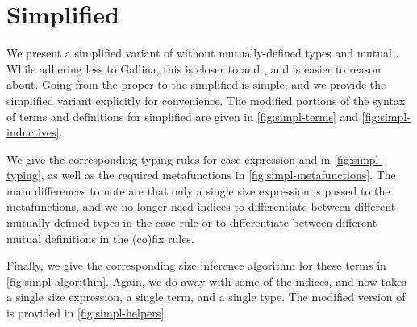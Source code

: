\section{Simplified \titlelang}
We present a simplified variant of \lang without mutually-defined \coinductive types and mutual \cofixpoints.
While adhering less to Gallina, this is closer to \CIChatminus and \CIChat, and is easier to reason about.
Going from the proper \lang to the simplified \lang is simple, and we provide the simplified variant explicitly for convenience.
The modified portions of the syntax of terms and \coinductive definitions for simplified \lang are given in \autoref{fig:simpl-terms} and \autoref{fig:simpl-inductives}.



We give the corresponding typing rules for case expression and \cofixpoints in \autoref{fig:simpl-typing}, as well as the required metafunctions in \autoref{fig:simpl-metafunctions}. The main differences to note are that only a single size expression is passed to the metafunctions, and we no longer need indices to differentiate between different mutually-defined \coinductive types in the case rule or to differentiate between different mutual \cofixpoint definitions in the (co)fix rules.



Finally, we give the corresponding size inference algorithm for these terms in \autoref{fig:simpl-algorithm}. Again, we do away with some of the indices, and \RecCheckLoop now takes a single size expression, a single term, and a single type.
The modified version of \RecCheckLoop is provided in \autoref{fig:simpl-helpers}.



